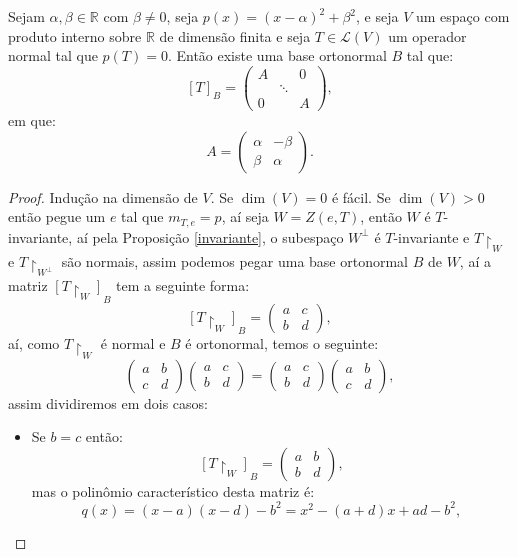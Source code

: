 \documentclass[11pt,twoside,a4paper]{book}
\begin{document}
\begin{proposicao}\label{cicloreal}
Sejam $\alpha,\beta\in\mathbb{R}$ com $\beta\neq 0$, seja $p(x)=(x-\alpha)^2+\beta^2$, e seja $V$ um espaço com produto interno sobre $\mathbb{R}$ de dimensão finita e seja $T\in\mathcal{L}(V)$ um operador normal tal que $p(T)=0.$ Então existe uma base ortonormal $B$ tal que:
\[
[T]_B=\begin{pmatrix}
A&&0\\&\ddots&\\0&&A
\end{pmatrix},
\]
em que:
\[
A=\begin{pmatrix}
\alpha&-\beta\\\beta&\alpha
\end{pmatrix}.
\]
\end{proposicao}
\begin{proof}
Indução na dimensão de $V$. Se $\dim(V)=0$ é fácil. Se $\dim(V)>0$ então pegue um $e$ tal que $m_{T,e}=p$, aí seja $W=Z(e,T)$, então $W$ é $T$-invariante, aí pela Proposição \ref{invariante}, o subespaço $W^\perp$ é $T$-invariante e $T\upharpoonright_W$ e $T\upharpoonright_{W^\perp}$ são normais, assim podemos pegar uma base ortonormal $B$ de $W$, aí a matriz $[T\upharpoonright_W]_B$ tem a seguinte forma:
\[
[T\upharpoonright_W]_B=\begin{pmatrix}
a&c\\b&d
\end{pmatrix},
\]
aí, como $T\upharpoonright_W$ é normal e $B$ é ortonormal, temos o seguinte:
\[
\begin{pmatrix}
a&b\\c&d
\end{pmatrix}\begin{pmatrix}
a&c\\b&d
\end{pmatrix}=\begin{pmatrix}
a&c\\b&d
\end{pmatrix}\begin{pmatrix}
a&b\\c&d
\end{pmatrix},
\]
assim dividiremos em dois casos:
\begin{itemize}
\item Se $b=c$ então:
\[
[T\upharpoonright_W]_B=\begin{pmatrix}
a&b\\b&d
\end{pmatrix},
\]
mas o polinômio característico desta matriz é:
\[
q(x)=(x-a)(x-d)-b^2=x^2-(a+d)x+ad-b^2,
\]
\end{itemize}
\end{proof}
\end{document}
